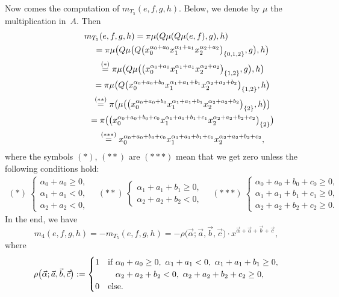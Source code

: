 \documentclass[pdftex]{sigma}
\numberwithin{equation}{section}
\renewcommand{\a}{\alpha}
\begin{document}
Now comes the computation of $m_{T_5}(e,f,g,h)$. Below, we denote by $\mu$ the multiplication in~$A$. Then
\begin{gather*}
m_{T_5}(e,f,g,h)= \pi\mu(Q\mu(Q\mu(e,f),g),h) \\
\hphantom{m_{T_5}(e,f,g,h)}{}= \pi\mu\big(Q\mu\big(Q\big(x_0^{\alpha_0+a_0}x_1^{\alpha_1+a_1}x_2^{\alpha_2+a_2}\big)_{\{0,1,2\}},g\big),h\big) \\
\hphantom{m_{T_5}(e,f,g,h)}{}\overset{(*)}{=}\pi\mu\big(Q\mu\big(\big(x_0^{\alpha_0+a_0}x_1^{\alpha_1+a_1}x_2^{\alpha_2+a_2}\big)_{\{1,2\}},g\big),h\big)   \\
\hphantom{m_{T_5}(e,f,g,h)}{}=\pi\mu\big(Q\big(x_0^{\alpha_0+a_0+b_0}x_1^{\alpha_1+a_1+b_1}x_2^{\alpha_2+a_2+b_2}\big)_{\{1,2\}},h\big) \\
\hphantom{m_{T_5}(e,f,g,h)}{}\overset{({*}{*})}{=}\pi\big(\mu\big(\big(x_0^{\alpha_0+a_0+b_0}x_1^{\alpha_1+a_1+b_1}x_2^{\alpha_2+a_2+b_2}\big)_{\{2\}},h\big)\big)   \\
\hphantom{m_{T_5}(e,f,g,h)}{}=\pi\big(\big(x_0^{\alpha_0+a_0+b_0+c_0}x_1^{\alpha_1+a_1+b_1+c_1}x_2^{\alpha_2+a_2+b_2+c_2}\big)_{\{2\}}\big) \\
\hphantom{m_{T_5}(e,f,g,h)}{}\overset{({*}{*}{*})}{=} x_0^{\alpha_0+a_0+b_0+c_0}x_1^{\alpha_1+a_1+b_1+c_1}x_2^{\alpha_2+a_2+b_2+c_2},
\end{gather*}
where the symbols $(*)$, $({*}{*})$ are $({*}{*}{*})$ mean that we get zero unless the following conditions hold:
\begin{gather*}
	(*)\ \begin{cases}
	\alpha_0+a_0\geq 0,\\
	\alpha_1+a_1<0,\\
	\alpha_2+a_2<0,
			\end{cases} \quad
	({*}{*})\ \begin{cases}
	\alpha_1+a_1+b_1\geq 0,\\
	\alpha_2+a_2+b_2<0,
			\end{cases}\quad
	({*}{*}{*})\ \begin{cases}
	\alpha_0+a_0+b_0+c_0\geq0,\\
	\alpha_1+a_1+b_1+c_1\geq0,\\
	\alpha_2+a_2+b_2+c_2\geq 0.
	\end{cases}
\end{gather*}
In the end, we have
\[
m_4(e,f,g,h)=-m_{T_5}(e,f,g,h)=
-\rho\big(\vec{\a};\vec{a},\vec{b},\vec{c}\big)\cdot x^{\vec{\a}+\vec{a}+\vec{b}+\vec{c}},
\]
where
\[
\rho\big(\vec{\a};\vec{a},\vec{b},\vec{c}\big):=\begin{cases}
  1 & \text{if} \ \alpha_0+a_0\geq 0,
    \ \alpha_1+a_1<0,
	\ \alpha_1+a_1+b_1\geq 0,\\
    &\hphantom{\text{if}}\ \alpha_2+a_2+b_2<0,
	\ \alpha_2+a_2+b_2+c_2\geq 0,\\
	0 & \text{else}.
\end{cases}\]
\end{document}
